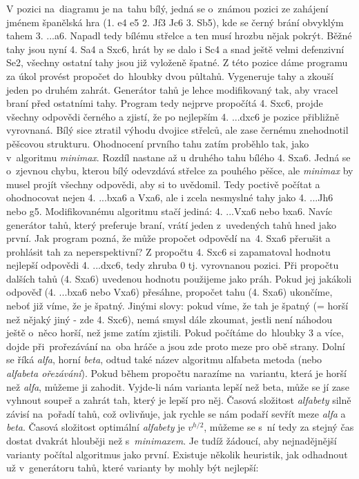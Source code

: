 \documentclass[11pt, titlepage]{article}
\begin{document}
V pozici na~diagramu je na~tahu bílý, jedná se o~známou pozici ze zahájení jménem španělská hra (1. e4 e5 2. Jf3 Jc6 3. Sb5), kde se černý brání obvyklým tahem 3. ...a6. Napadl tedy bílému střelce a ten musí hrozbu nějak pokrýt. Běžné tahy jsou nyní 4. Sa4 a Sxc6, hrát by se dalo i Sc4 a snad ještě velmi defenzivní Se2, všechny ostatní tahy jsou již vyloženě špatné. Z této pozice dáme programu za úkol provést propočet do~hloubky dvou půltahů. Vygeneruje tahy a zkouší jeden po druhém zahrát. Generátor tahů je lehce modifikovaný tak, aby vracel braní před ostatními tahy. Program tedy nejprve propočítá 4. Sxc6, projde všechny odpovědi černého a zjistí, že po nejlepším 4. ...dxc6 je pozice přibližně vyrovnaná. Bílý sice ztratil výhodu dvojice střelců, ale zase černému znehodnotil pěšcovou strukturu. Ohodnocení prvního tahu zatím proběhlo tak, jako v~algoritmu {\it minimax}. Rozdíl nastane až u druhého tahu bílého 4. Sxa6. Jedná se o~zjevnou chybu, kterou bílý odevzdává střelce za pouhého pěšce, ale {\it minimax} by musel projít všechny odpovědi, aby si to uvědomil. Tedy poctivě počítat a ohodnocovat nejen 4. ...bxa6 a Vxa6, ale i zcela nesmyslné tahy jako 4. ...Jh6 nebo g5. Modifikovanému algoritmu stačí jediná: 4. ...Vxa6 nebo bxa6. Navíc generátor tahů, který preferuje braní, vrátí jeden z~uvedených tahů hned jako první. Jak program pozná, že může propočet odpovědí na~4. Sxa6 přerušit a prohlásit tah za neperspektivní? Z propočtu 4. Sxc6 si zapamatoval hodnotu nejlepší odpovědi 4. ...dxc6, tedy zhruba 0 tj. vyrovnanou pozici. Při propočtu dalších tahů (4. Sxa6) uvedenou hodnotu použijeme jako práh. Pokud jej jakákoli odpověď (4. ...bxa6 nebo Vxa6) přesáhne, propočet tahu (4. Sxa6) ukončíme, neboť již víme, že je špatný. Jinými slovy: pokud víme, že tah je špatný (= horší než nějaký jiný - zde 4. Sxc6), nemá smysl dále zkoumat, jestli není náhodou ještě o~něco horší, než jsme zatím zjistili.
Pokud počítáme do~hloubky 3 a více, dojde při~prořezávání na~oba hráče a jsou zde proto meze pro obě strany. Dolní se říká {\it alfa}, horní {\it beta}, odtud také název algoritmu alfabeta metoda (nebo {\it alfabeta ořezávání}). Pokud během propočtu narazíme na~variantu, která je horší než {\it alfa}, můžeme ji zahodit. Vyjde-li nám varianta lepší než beta, může se jí zase vyhnout soupeř a zahrát tah, který je lepší pro něj. Časová složitost {\it alfabety} silně závisí na~pořadí tahů, což ovlivňuje, jak rychle se nám podaří sevřít meze {\it alfa} a {\it beta}. Časová složitost optimální {\it alfabety} je \begin{math}v^{h/2}\end{math}, můžeme se s~ní tedy za stejný čas dostat dvakrát hlouběji než s~{\it minimaxem}. Je tudíž žádoucí, aby nejnadějnější varianty počítal algoritmus jako první. Existuje několik heuristik, jak odhadnout už v~generátoru tahů, které varianty by mohly být nejlepší:
\end{document}
